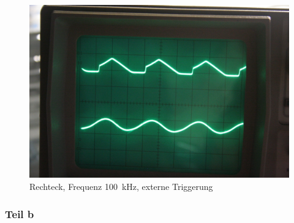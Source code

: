 \begin{figure}
	\centering
	\begin{minipage}{.45\linewidth}
	\end{minipage}
	\hfill
	\begin{minipage}{.45\linewidth}
	\includegraphics[width=\linewidth]{Fotos/IMG_0778-1500.jpg}
	\end{minipage}
	\caption{%
		Rechteck, Frequenz \SI{100}{\kilo\hertz},
		externe Triggerung
	}
	\label{fig:0778}
\end{figure}

\subsubsection{Teil b}

